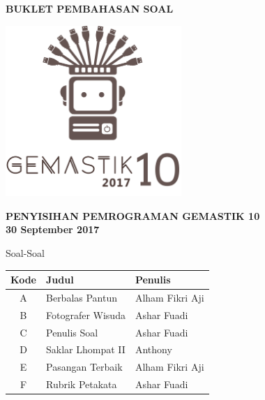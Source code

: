\documentclass[a4paper]{article}
\begin{document}
\begin{titlepage}
\begin{center}

    \textbf{\huge BUKLET PEMBAHASAN SOAL}
    
    \vspace{1cm} %
    
    \includegraphics[width=0.5\textwidth]{../gemastiklogo}
    
	\vspace{1cm} %
    
    \textbf{\LARGE PENYISIHAN PEMROGRAMAN GEMASTIK 10}\\[0.5cm]
    \textbf{\LARGE 30 September 2017}

	\vfill
	
	{\Large Soal-Soal}
	
	\def\arraystretch{1.5} %
	\begin{tabular}{|c|l|l|}
		\hline
		\textbf{Kode} & \textbf{Judul} & \textbf{Penulis} \\
		\hline
		A & Berbalas Pantun & Alham Fikri Aji \\
		B & Fotografer Wisuda & Ashar Fuadi \\
		C & Penulis Soal & Ashar Fuadi \\
		D & Saklar Lhompat II & Anthony \\
		E & Pasangan Terbaik & Alham Fikri Aji \\
		F & Rubrik Petakata & Ashar Fuadi \\
		\hline
	\end{tabular}

\end{center}
\end{titlepage}


\pagebreak

\pagebreak

\pagebreak

\pagebreak

\pagebreak

\end{document}
